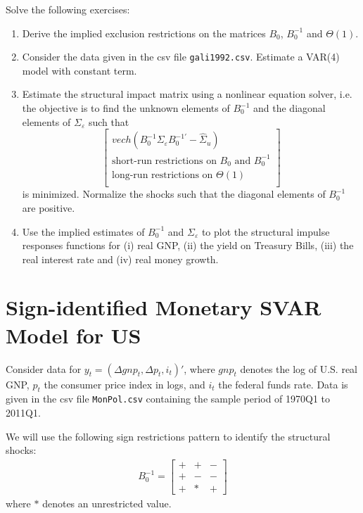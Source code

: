 \documentclass{article}
\begin{document}
Solve the following exercises:
\begin{enumerate}
	\item Derive the implied exclusion restrictions on the matrices $B_0$, $B_0^{-1}$ and $\Theta(1)$.
	\item Consider the data given in the csv file \texttt{gali1992.csv}.
	Estimate a VAR(4) model with constant term.
	\item Estimate the structural impact matrix using a nonlinear equation solver,
	  i.e. the objective is to find the unknown elements of $B_0^{-1}$ and the diagonal elements of $\Sigma_\varepsilon$ such that
	$$\begin{bmatrix}
	vech(B_0^{-1} \Sigma_\varepsilon B_0^{-1'}-\hat{\Sigma}_u)\\
	\text{short-run restrictions on }B_0 \text{ and } B_0^{-1} \\
	\text{long-run restrictions on }\Theta(1)\\
	\end{bmatrix}$$
	is minimized.
	Normalize the shocks such that the diagonal elements of $B_0^{-1}$ are positive.
	\item Use the implied estimates of $B_0^{-1}$ and $\Sigma_\varepsilon$ to plot the structural impulse responses functions
	for (i) real GNP, (ii) the yield on Treasury Bills, (iii) the real interest rate and (iv) real money growth.
\end{enumerate}

\newpage

\section[Sign-identified Monetary SVAR Model for US]{Sign-identified Monetary SVAR Model for US\label{ex:SignIdentifiedMonetarySVARUS}}
Consider data for $y_t = (\Delta gnp_t,\Delta p_t,i_t)'$,
  where $gnp_t$ denotes the log of U.S. real GNP,
  $p_t$ the consumer price index in logs,
  and $i_t$ the federal funds rate.
  Data is given in the csv file \texttt{MonPol.csv} containing the sample period of 1970Q1 to 2011Q1.

We will use the following sign restrictions pattern to identify the structural shocks:
\begin{align}
B_0^{-1}=\begin{bmatrix}
	+ & + & -\\
	+ & - & -\\
	+ & *  & +
	\label{eq:signpattern}
\end{bmatrix}
\end{align}
where $*$ denotes an unrestricted value.
\end{document}
